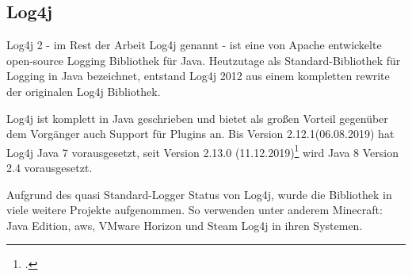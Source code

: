
\subsection{Log4j}\label{subsec:log4j}
Log4j 2 - im Rest der Arbeit Log4j genannt - ist eine von Apache entwickelte open-source Logging Bibliothek für Java.
Heutzutage als Standard-Bibliothek für Logging in Java bezeichnet, entstand Log4j 2012 aus einem kompletten rewrite der originalen Log4j Bibliothek.

Log4j ist komplett in Java geschrieben und bietet als großen Vorteil gegenüber dem Vorgänger auch Support für Plugins an.
Bis Version 2.12.1(06.08.2019) hat Log4j Java 7 vorausgesetzt, seit Version 2.13.0 (11.12.2019)\footcite{log4jChange} wird Java 8 Version 2.4 vorausgesetzt.

Aufgrund des quasi Standard-Logger Status von Log4j, wurde die Bibliothek in viele weitere Projekte aufgenommen.
So verwenden unter anderem Minecraft: Java Edition, \gls{aws}, VMware Horizon und Steam Log4j in ihren Systemen.
